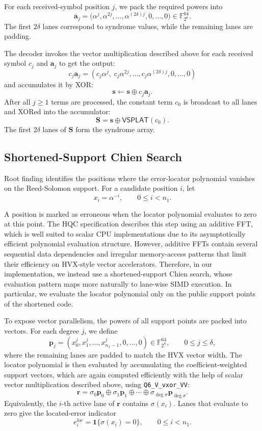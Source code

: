 \documentclass[12pt,a4paper]{report}
\begin{document}
For each received-symbol position \(j\), we pack the required powers into
\[
    \mathbf a_j =
    \bigl(
        \alpha^j,\alpha^{2j},\ldots,\alpha^{(2\delta)j},
        0,\ldots,0
    \bigr)
    \in \mathbb F_{2^8}^{64}.
\]
The first \(2\delta\) lanes correspond to syndrome values, while the remaining
lanes are padding.

The decoder invokes the vector multiplication described above for each received symbol $c_j$ and $\mathbf{a}_j$ to get the output:
\[
    c_j \mathbf a_j
    =
    (c_j\alpha^j,\;c_j\alpha^{2j},\ldots,c_j\alpha^{(2\delta)j},0,\ldots,0)
\]
and accumulates it by XOR:
\[
    \mathbf s \leftarrow \mathbf s \oplus c_j\mathbf a_j .
\]
After all \(j\ge 1\) terms are processed, the constant term \(c_0\) is
broadcast to all lanes and XORed into the accumulator:
\[
    \mathbf S = \mathbf s \oplus \mathsf{VSPLAT}(c_0).
\]
The first \(2\delta\) lanes of \(\mathbf S\) form the syndrome array.

\subsection{Shortened-Support Chien Search}
\label{sec:rs_code_3_3_3}
Root finding identifies the positions where the error-locator polynomial
vanishes on the Reed-Solomon support. For a candidate position \(i\), let
\[
    x_i = \alpha^{-i}, \qquad 0 \le i < n_1 .
\]

A position is marked as erroneous when the locator polynomial evaluates to zero at this point. The HQC specification describes this step using an additive FFT, which is well suited to scalar CPU implementations due to its asymptotically efficient polynomial evaluation structure. However, additive FFTs contain several sequential data dependencies and irregular memory-access patterns that limit their efficiency on HVX-style vector accelerators. Therefore, in our implementation, we instead use a shortened-support Chien search, whose evaluation pattern maps more naturally to lane-wise SIMD execution. In particular, we evaluate the locator polynomial only on the public support points of the shortened code.

To expose vector parallelism, the powers of all support points are packed into
vectors. For each degree \(j\), we define
\[
    \mathbf{p}_j
    =
    (x_0^j,x_1^j,\ldots,x_{n_1-1}^j,0,\ldots,0)
    \in \mathbb{F}_{2^8}^{64},
    \qquad
    0\le j\le \delta,
\]
where the remaining lanes are padded to match the HVX vector width. The locator
polynomial is then evaluated by accumulating the coefficient-weighted support
vectors, which are again computed efficiently with the help of scalar vector multiplication described above, using \texttt{Q6\_V\_vxor\_VV}:
\[
    \mathbf{r}
    =
    \sigma_0\mathbf{p}_0
    \oplus
    \sigma_1\mathbf{p}_1
    \oplus
    \cdots
    \oplus
    \sigma_{\deg\sigma}\mathbf{p}_{\deg\sigma}.
\]
Equivalently, the \(i\)-th active lane of \(\mathbf r\) contains
\(\sigma(x_i)\). Lanes that evaluate to zero give
the located-error indicator
\[
    e_i^{\mathrm{loc}} = \mathbf{1}\{\sigma(x_i)=0\},
    \qquad 0\le i<n_1.
\]
\end{document}
